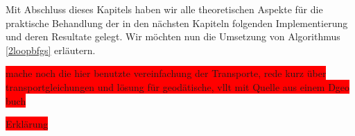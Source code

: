 Mit Abschluss dieses Kapitels haben wir alle theoretischen Aspekte für die praktische Behandlung der in den nächsten Kapiteln folgenden Implementierung und deren Resultate gelegt. Wir möchten nun die Umsetzung von Algorithmus \ref{2loopbfgs} erläutern.

\colorbox{red}{mache noch die hier benutzte vereinfachung der Transporte, rede kurz über transportgleichungen und lösung für geodätische, vllt mit Quelle aus einem Dgeo buch}


\colorbox{red}{Erklärung}

